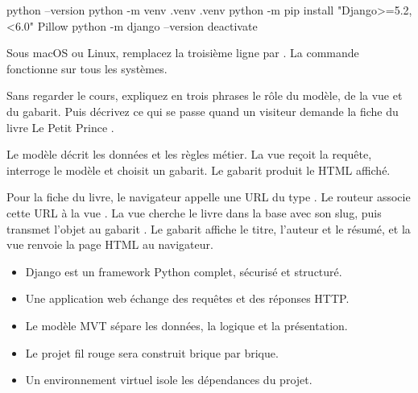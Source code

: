 \begin{correction}
\begin{terminal}
python --version
python -m venv .venv
.venv\Scripts\activate
python -m pip install "Django>=5.2,<6.0" Pillow
python -m django --version
deactivate
\end{terminal}

Sous macOS ou Linux, remplacez la troisième ligne par
. La commande  fonctionne sur
tous les systèmes.
\end{correction}

\begin{exercice}
Sans regarder le cours, expliquez en trois phrases le rôle du modèle, de la vue et
du gabarit. Puis décrivez ce qui se passe quand un visiteur demande la fiche du
livre \og Le Petit Prince \fg.
\end{exercice}

\begin{correction}
Le modèle décrit les données et les règles métier. La vue reçoit la requête,
interroge le modèle et choisit un gabarit. Le gabarit produit le HTML affiché.

Pour la fiche du livre, le navigateur appelle une URL du type
. Le routeur associe cette URL à la vue
. La vue cherche le livre dans la base avec son slug, puis
transmet l'objet  au gabarit . Le gabarit affiche le
titre, l'auteur et le résumé, et la vue renvoie la page HTML au navigateur.
\end{correction}

\begin{retenir}
\begin{itemize}
  \item Django est un framework Python complet, sécurisé et structuré.
  \item Une application web échange des requêtes et des réponses HTTP.
  \item Le modèle MVT sépare les données, la logique et la présentation.
  \item Le projet fil rouge \gesibiblio{} sera construit brique par brique.
  \item Un environnement virtuel isole les dépendances du projet.
\end{itemize}
\end{retenir}
